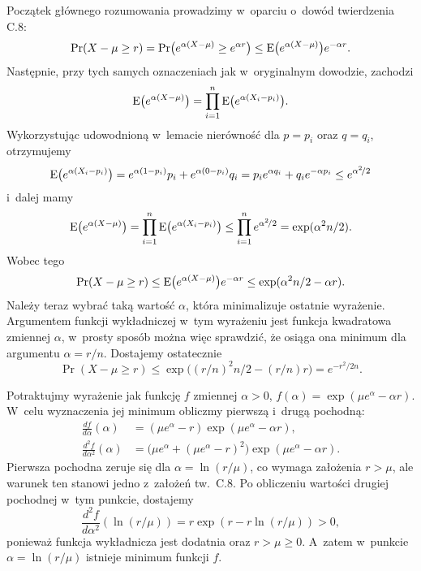 Początek głównego rozumowania prowadzimy w~oparciu o~dowód twierdzenia C.8:
\[
	\Pr(X-\mu\ge r) = \Pr\bigl(e^{\alpha(X-\mu)}\ge e^{\alpha r}\bigr) \le \operatorname{E}\bigl(e^{\alpha(X-\mu)}\bigr)e^{-\alpha r}.
\]
Następnie, przy tych samych oznaczeniach jak w~oryginalnym dowodzie, zachodzi
\[
	\operatorname{E}\bigl(e^{\alpha(X-\mu)}\bigr) = \prod_{i=1}^n\operatorname{E}\bigl(e^{\alpha(X_i-p_i)}\bigr).
\]
Wykorzystując udowodnioną w~lemacie nierówność dla $p=p_i$ oraz $q=q_i$, otrzymujemy
\[
	\operatorname{E}\bigl(e^{\alpha(X_i-p_i)}\bigr) = e^{\alpha(1-p_i)}p_i+e^{\alpha(0-p_i)}q_i = p_ie^{\alpha q_i}+q_ie^{-\alpha p_i} \le e^{\alpha^2\!/2}
\]
i~dalej mamy
\[
	\operatorname{E}\bigl(e^{\alpha(X-\mu)}\bigr) = \prod_{i=1}^n\operatorname{E}\bigl(e^{\alpha(X_i-p_i)}\bigr) \le \prod_{i=1}^ne^{\alpha^2\!/2} = \exp(\alpha^2n/2).
\]
Wobec tego
\[
	\Pr(X-\mu\ge r) \le \operatorname{E}\bigl(e^{\alpha(X-\mu)}\bigr)e^{-\alpha r} \le \exp(\alpha^2n/2-\alpha r).
\]
Należy teraz wybrać taką wartość $\alpha$, która minimalizuje ostatnie wyrażenie.
Argumentem funkcji wykładniczej w~tym wyrażeniu jest funkcja kwadratowa zmiennej $\alpha$, w~prosty sposób można więc sprawdzić, że osiąga ona minimum dla argumentu $\alpha=r/n$.
Dostajemy ostatecznie
\[
	\Pr(X-\mu\ge r) \le \exp\bigl((r/n)^2n/2-(r/n)r\bigr) = e^{-r^2\!/{2n}}.
\]

\exercise %
Potraktujmy wyrażenie jak funkcję $f$ zmiennej $\alpha>0$, $f(\alpha)=\exp(\mu e^\alpha-\alpha r).$ W~celu wyznaczenia jej minimum obliczmy pierwszą i~drugą pochodną:
\begin{align*}
	\frac{df}{d\alpha}(\alpha) &= (\mu e^\alpha-r)\exp(\mu e^\alpha-\alpha r), \\
	\frac{d^2\!f}{d\alpha^2}(\alpha) &= \bigl(\mu e^\alpha+(\mu e^\alpha-r)^2\bigr)\exp(\mu e^\alpha-\alpha r).
\end{align*}
Pierwsza pochodna zeruje się dla $\alpha=\ln(r/\mu)$, co wymaga założenia $r>\mu$, ale warunek ten stanowi jedno z~założeń tw.\ C.8.
Po obliczeniu wartości drugiej pochodnej w~tym punkcie, dostajemy
\[
	\frac{d^2\!f}{d\alpha^2}(\ln(r/\mu)) = r\exp(r-r\ln(r/\mu)) > 0,
\]
ponieważ funkcja wykładnicza jest dodatnia oraz $r>\mu\ge0$.
A~zatem w~punkcie $\alpha=\ln(r/\mu)$ istnieje minimum funkcji $f$.
